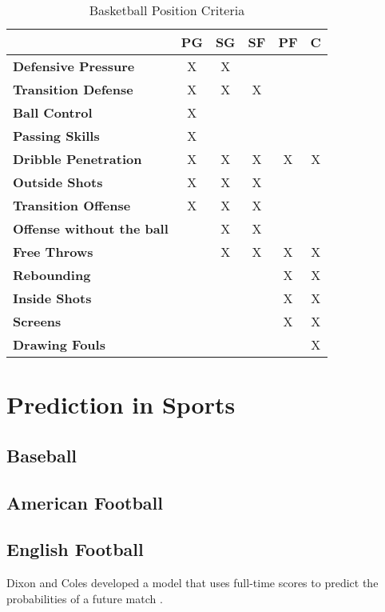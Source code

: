\begin{table}[ht]
\centering
\begin{tabular}{|l|c|c|c|c|c|}
\hline
 & \textbf{PG} & \textbf{SG} & \textbf{SF} & \textbf{PF} & \textbf{C} \\ \hline
\textbf{Defensive Pressure} & X & X &  &  &  \\ \hline
\textbf{Transition Defense} & X & X & X &  &  \\ \hline
\textbf{Ball Control} & X &  &  &  &  \\ \hline
\textbf{Passing Skills} & X &  &  &  &  \\ \hline
\textbf{Dribble Penetration} & X & X & X & X & X \\ \hline
\textbf{Outside Shots} & X & X & X &  &  \\ \hline
\textbf{Transition Offense} & X & X & X &  &  \\ \hline
\textbf{Offense without the ball} &  & X & X &  &  \\ \hline
\textbf{Free Throws} &  & X & X & X & X \\ \hline
\textbf{Rebounding} &  &  &  & X & X \\ \hline
\textbf{Inside Shots} &  &  &  & X & X \\ \hline
\textbf{Screens} &  &  &  & X & X \\ \hline
\textbf{Drawing Fouls} &  &  &  &  & X \\ \hline
\end{tabular}
\caption{Basketball Position Criteria}
\label{table:position_criteria}
\end{table}

\section{Prediction in Sports}

\subsection{Baseball}

\subsection{American Football}

\subsection{English Football}
Dixon and Coles developed a model that uses full-time scores to predict the probabilities of a future match \citep{dixon_coles}.

